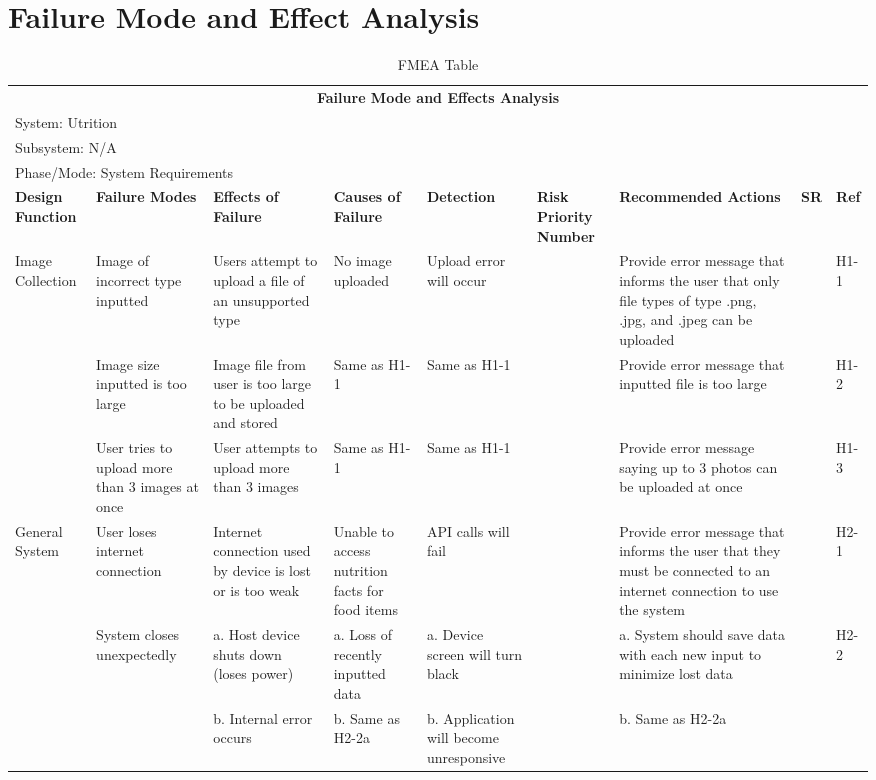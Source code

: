 \documentclass{article}
\begin{document}
\section{Failure Mode and Effect Analysis}


\begin{landscape}
\begin{table}[ht]
	\centering
	\begin{adjustbox}{width=\hsize,center=\textwidth}
	\begin{tabular}{|l|l|l|l|l|l|l|l|l|}
		\hline
		\multicolumn{9}{|c|}{\textbf{Failure Mode and Effects Analysis}}\\
		\multicolumn{9}{|l|}{System: Utrition}\\
		\multicolumn{9}{|l|}{Subsystem: N/A}\\
		\multicolumn{9}{|l|}{Phase/Mode: System Requirements}\\\hline
		\textbf{Design Function} & \textbf{Failure Modes} & \textbf{Effects of Failure} & \textbf{Causes of Failure} & \textbf{Detection} & \textbf{Risk Priority Number} & \textbf{Recommended Actions} & \textbf{SR} & \textbf{Ref} \\ \hline
		\multirow{3}{*}{Image Collection} & Image of incorrect type inputted & Users attempt to upload a file of an unsupported type & No image uploaded & Upload error will occur & & Provide error message that informs the user that only file types of type .png, .jpg, and .jpeg can be uploaded & & H1-1 \\ \cline{2-9}
		& Image size inputted is too large & Image file from user is too large to be uploaded and stored & Same as H1-1 & Same as H1-1 & & Provide error message that inputted file is too large & & H1-2\\ \cline{2-9}
		& User tries to upload more than 3 images at once & User attempts to upload more than 3 images & Same as H1-1 & Same as H1-1 & & Provide error message saying up to 3 photos can be uploaded at once & & H1-3\\ \hline
		\multirow{3}{*}{General System} & User loses internet connection & Internet connection used by device is lost or is too weak & Unable to access nutrition facts for food items & API calls will fail & & Provide error message that informs the user that they must be connected to an internet connection to use the system & & H2-1 \\ \cline{2-9}
		& \multirow{2}{*}{System closes unexpectedly} & a. Host device shuts down (loses power) & a. Loss of recently inputted data & a. Device screen will turn black & & a. System should save data with each new input to minimize lost data & & \multirow{2}{*}{H2-2}\\
		& & b. Internal error occurs & b. Same as H2-2a & b. Application will become unresponsive & & b. Same as H2-2a & &\\ \hline
	\end{tabular}
	\end{adjustbox}
	\caption{FMEA Table}
	\label{tab:my_label}
\end{table}
\end{landscape}
\end{document}
